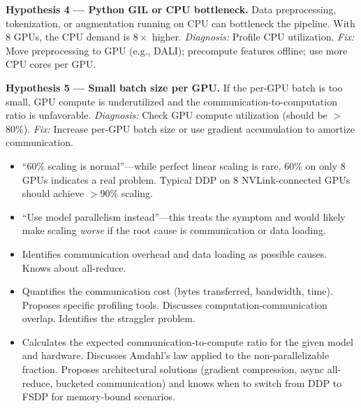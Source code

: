 \begin{interviewq}
\textbf{Hypothesis 4 --- Python GIL or CPU bottleneck.} Data preprocessing, tokenization, or augmentation running on CPU can bottleneck the pipeline. With 8 GPUs, the CPU demand is $8\times$ higher. \textit{Diagnosis:} Profile CPU utilization. \textit{Fix:} Move preprocessing to GPU (e.g., DALI); precompute features offline; use more CPU cores per GPU.

\textbf{Hypothesis 5 --- Small batch size per GPU.} If the per-GPU batch is too small, GPU compute is underutilized and the communication-to-computation ratio is unfavorable. \textit{Diagnosis:} Check GPU compute utilization (should be $>$80\%). \textit{Fix:} Increase per-GPU batch size or use gradient accumulation to amortize communication.

\redflags
\begin{itemize}
    \item ``60\% scaling is normal''---while perfect linear scaling is rare, 60\% on only 8 GPUs indicates a real problem. Typical DDP on 8 NVLink-connected GPUs should achieve $>$90\% scaling.
    \item ``Use model parallelism instead''---this treats the symptom and would likely make scaling \textit{worse} if the root cause is communication or data loading.
\end{itemize}


\goodgreat
\begin{itemize}
    \item {} Identifies communication overhead and data loading as possible causes. Knows about all-reduce.
    \item {} Quantifies the communication cost (bytes transferred, bandwidth, time). Proposes specific profiling tools. Discusses computation-communication overlap. Identifies the straggler problem.
    \item {} Calculates the expected communication-to-compute ratio for the given model and hardware. Discusses Amdahl's law applied to the non-parallelizable fraction. Proposes architectural solutions (gradient compression, async all-reduce, bucketed communication) and knows when to switch from DDP to FSDP for memory-bound scenarios.
\end{itemize}

\end{interviewq}

